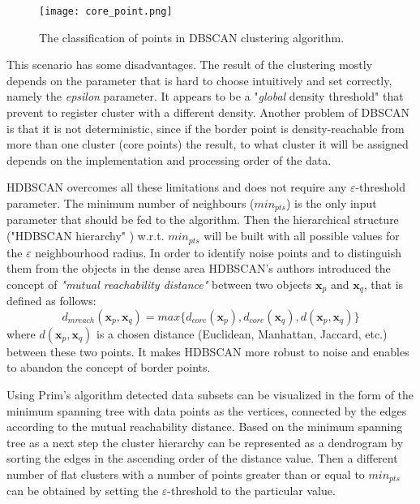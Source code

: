 \documentclass[fontsize=12pt,a4paper,twoside,openany]{scrbook}
\begin{document}
\begin{figure}[h]
\centering
\texttt{[image: core\_point.png]}
\caption{The classification of points in DBSCAN clustering algorithm.}
\label{fig:core_point}
\end{figure}

This scenario has some disadvantages. The result of the clustering mostly depends on the parameter that is hard to choose intuitively and set correctly, namely the \emph{epsilon} parameter. It appears to be a "\emph{global} density threshold" \parencite{Malzer20} that prevent to register cluster with a different density. Another problem of DBSCAN is that it is not deterministic, since if the border point is density-reachable from more than one cluster (core points) the result, to what cluster it will be assigned depends on the implementation and processing order of the data. 

HDBSCAN overcomes all these limitations and does not require any \(\varepsilon\)-threshold parameter. The minimum number of neighbours (\(min_{pts}\)) is the only input parameter that should be fed to the algorithm. Then the hierarchical structure ("HDBSCAN hierarchy" \parencite{Campello13}) w.r.t. \(min_{pts}\) will be built with all possible values for the \(\varepsilon\) neighbourhood radius. In order to identify noise points and to distinguish them from the objects in the dense area HDBSCAN's authors introduced the concept of \emph{"mutual reachability distance"} \parencite[p.~163]{Campello13} between two objects \(\textbf{x}_p\) and \(\textbf{x}_q\), that is defined as follows: \[d_{mreach}(\textbf{x}_p, \textbf{x}_q) = max\{d_{core}(\textbf{x}_p), d_{core}(\textbf{x}_q), d(\textbf{x}_p, \textbf{x}_q)\}\] 
where \(d(\textbf{x}_p, \textbf{x}_q)\) is a chosen distance (Euclidean, Manhattan, Jaccard, etc.) between these two points. It makes HDBSCAN more robust to noise and enables to abandon the concept of border points. 

Using Prim's algorithm \parencite{Mamun16} detected data subsets can be visualized in the form of the minimum spanning tree with data points as the vertices, connected by the edges according to the mutual reachability distance. Based on the minimum spanning tree as a next step the cluster hierarchy can be represented as a dendrogram by sorting the edges in the ascending order of the distance value. Then a different number of flat clusters with a number of points greater than or equal to \(min_{pts}\) can be obtained by setting the \(\varepsilon\)-threshold to the particular value.
\end{document}
